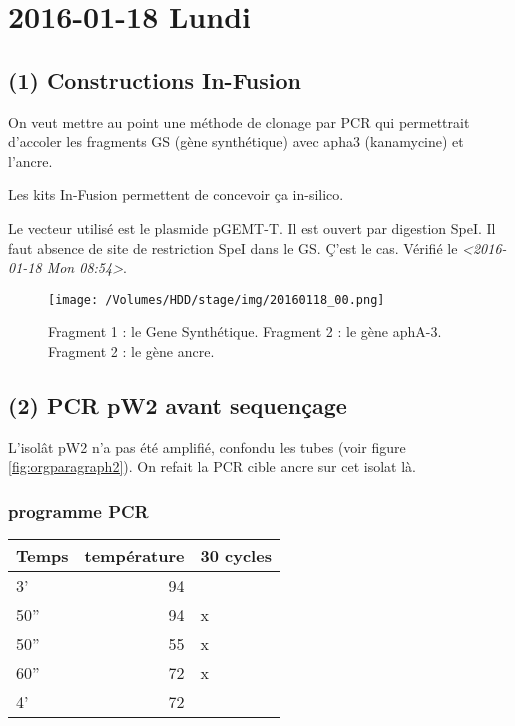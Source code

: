 \documentclass[9pt, oneside, twocolumn]{scrartcl}
\begin{document}
\section{2016-01-18 Lundi}
\label{sec:orgheadline52}
\subsection{(1) Constructions In-Fusion}
\label{sec:orgheadline45}
On veut mettre au point une méthode de clonage par PCR qui permettrait d'accoler
les fragments GS (gène synthétique) avec apha3 (kanamycine) et l'ancre.

Les kits In-Fusion permettent de concevoir ça in-silico.

Le vecteur utilisé est le plasmide pGEMT-T. Il est ouvert par digestion SpeI. Il
faut absence de site de restriction SpeI dans le GS. Ç'est le cas. Vérifié le
\textit{<2016-01-18 Mon 08:54>}.

\begin{figure}[htb]
\centering
\texttt{[image: /Volumes/HDD/stage/img/20160118\_00.png]}
\caption{Fragment 1 : le Gene Synthétique. Fragment 2 : le gène aphA-3. Fragment 2 : le gène ancre.}
\end{figure}
\subsection{(2) PCR pW2 avant sequençage}
\label{sec:orgheadline48}
L'isolât pW2 n'a pas été amplifié, confondu les tubes (voir figure
\ref{fig:orgparagraph2}). On refait la PCR cible ancre sur cet isolat là. 

\subsubsection{programme PCR}
\label{sec:orgheadline46}
\begin{center}
\begin{tabular}{lrl}
\toprule
Temps & température & 30 cycles\\
\midrule
3' & 94 & \\
50'' & 94 & x\\
50'' & 55 & x\\
60'' & 72 & x\\
4' & 72 & \\
\bottomrule
\end{tabular}
\end{center}
\end{document}
